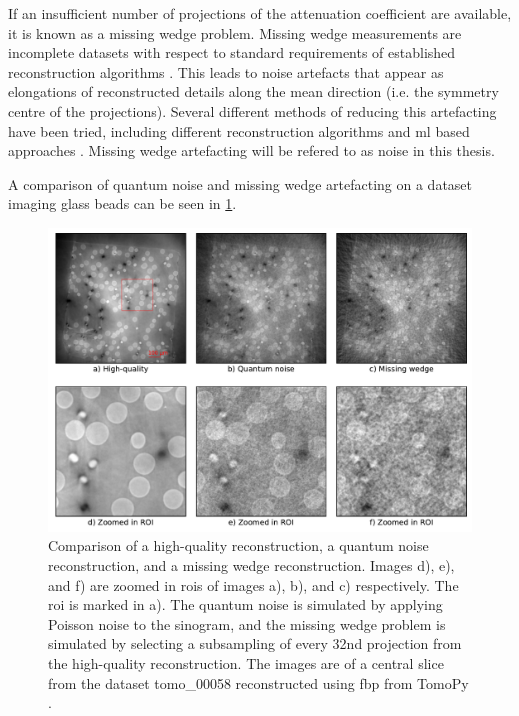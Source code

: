 If an insufficient number of projections of the attenuation coefficient are available, it is known as a missing wedge problem. Missing wedge measurements are incomplete datasets with respect to standard requirements of established reconstruction algorithms \cite{10.1111/jmi.12313}. This leads to noise artefacts that appear as elongations of reconstructed details along the mean direction (i.e. the symmetry centre of the projections). Several different methods of reducing this artefacting have been tried, including different reconstruction algorithms \cite{10.1111/jmi.12313} and \acrshort{ml} based approaches \cite{liu2020tomogan}. Missing wedge artefacting will be refered to as noise in this thesis. 

A comparison of quantum noise and missing wedge artefacting on a dataset imaging glass beads can be seen in \cref{fig:noisecomparison}. 

\begin{figure}[htbp]  
    \centering
    \includegraphics[width=.9\textwidth]{figures/noisecomparison.pdf}
    \caption[Reconstruction noise comparison]{Comparison of a high-quality reconstruction, a quantum noise reconstruction, and a missing wedge reconstruction. Images d), e), and f) are zoomed in \acrshort{roi}s of images a), b), and c) respectively. The \acrshort{roi} is marked in a). The quantum noise is simulated by applying Poisson noise to the sinogram, and the missing wedge problem is simulated by selecting a subsampling of every 32nd projection from the high-quality reconstruction. The images are of a central slice from the dataset tomo\_00058 \cite{datasetglassspheres} reconstructed using \acrshort{fbp} from TomoPy \cite{TomoBank}. }
    \label{fig:noisecomparison}
\end{figure}

